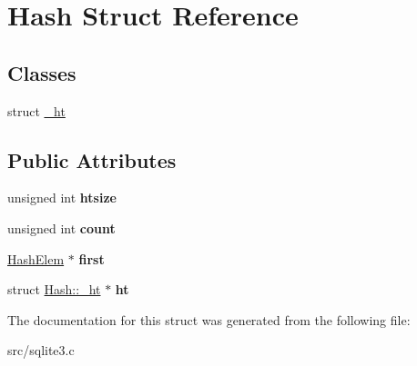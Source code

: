 \hypertarget{struct_hash}{\section{Hash Struct Reference}
\label{struct_hash}
}
\subsection*{Classes}
\begin{DoxyCompactItemize}
\item 
struct \hyperlink{struct_hash_1_1__ht}{\-\_\-ht}
\end{DoxyCompactItemize}
\subsection*{Public Attributes}
\begin{DoxyCompactItemize}
\item 
\hypertarget{struct_hash_a072258e24a38e09175f1308deb013bc8}{unsigned int {\bfseries htsize}}\label{struct_hash_a072258e24a38e09175f1308deb013bc8}

\item 
\hypertarget{struct_hash_a7ab16f173cdc347ffbe39eaa85ee6fda}{unsigned int {\bfseries count}}\label{struct_hash_a7ab16f173cdc347ffbe39eaa85ee6fda}

\item 
\hypertarget{struct_hash_a2cfc9936ca2a624c6492ab6557f4705b}{\hyperlink{struct_hash_elem}{Hash\-Elem} $\ast$ {\bfseries first}}\label{struct_hash_a2cfc9936ca2a624c6492ab6557f4705b}

\item 
\hypertarget{struct_hash_ac0f36e03746a3fe69643db08d93bc0c4}{struct \hyperlink{struct_hash_1_1__ht}{Hash\-::\-\_\-ht} $\ast$ {\bfseries ht}}\label{struct_hash_ac0f36e03746a3fe69643db08d93bc0c4}

\end{DoxyCompactItemize}


The documentation for this struct was generated from the following file\-:\begin{DoxyCompactItemize}
\item 
src/sqlite3.\-c\end{DoxyCompactItemize}

